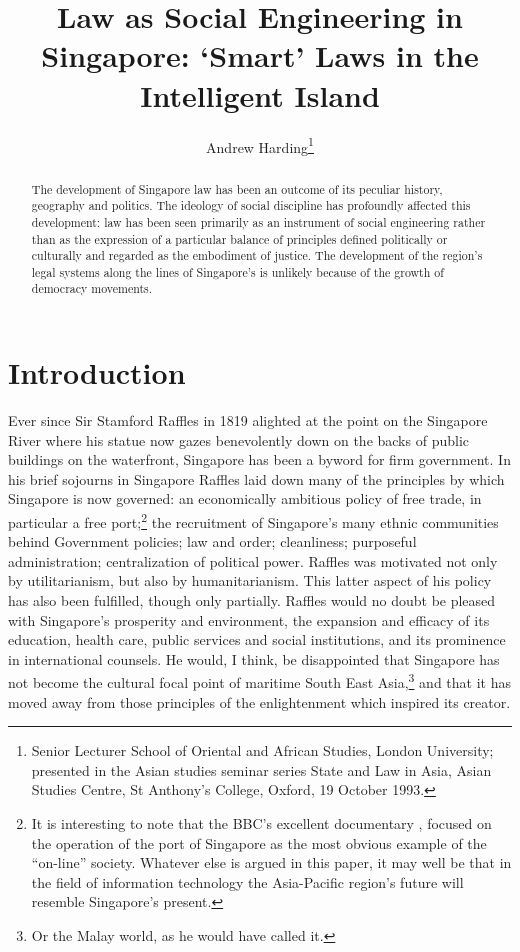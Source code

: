 


\title{Law as Social Engineering in Singapore: `Smart' Laws in the
Intelligent Island}
\author{Andrew Harding\thanks{Senior Lecturer School of Oriental and
African Studies, London University; presented in the Asian studies
seminar series State and Law in Asia, Asian Studies Centre, St
Anthony's College, Oxford, 19 October 1993.}}
\maketitle

\begin{abstract}
  The development of Singapore law has been an outcome of its
  peculiar history, geography and politics. The ideology of
  social discipline has profoundly affected this development: law
  has been seen primarily as an instrument of social engineering
  rather than as the expression of a particular balance of
  principles defined politically or culturally and regarded as
  the embodiment of justice. The development of the region's
  legal systems along the lines of Singapore's is unlikely
  because of the growth of democracy movements.
\end{abstract}

\section{Introduction}
Ever since Sir Stamford Raffles in 1819 alighted at the point on
the Singapore River where his statue now gazes benevolently down
on the backs of public buildings on the waterfront, Singapore has
been a byword for firm government. In his brief sojourns in
Singapore Raffles laid down many of the principles by which
Singapore is now governed: an economically ambitious policy of
free trade, in particular a free port;\footnote{ It is
  interesting to note that the BBC's excellent documentary
  , focused on the operation of the
  port of Singapore as the most obvious example of the
  ``on-line'' society. Whatever else is argued in this paper, it
  may well be that in the field of information technology the
  Asia-Pacific region's future will resemble Singapore's
  present.} the recruitment of Singapore's many ethnic
communities behind Government policies; law and order;
cleanliness; purposeful administration; centralization of
political power. Raffles was motivated not only by
utilitarianism, but also by humanitarianism.  This latter aspect
of his policy has also been fulfilled, though only partially.
Raffles would no doubt be pleased with Singapore's prosperity and
environment, the expansion and efficacy of its education, health
care, public services and social institutions, and its prominence
in international counsels. He would, I think, be disappointed
that Singapore has not become the cultural focal point of
maritime South East Asia,\footnote{ Or the Malay world, as he
  would have called it.} and that it has moved away from those
principles of the enlightenment which inspired its creator.

